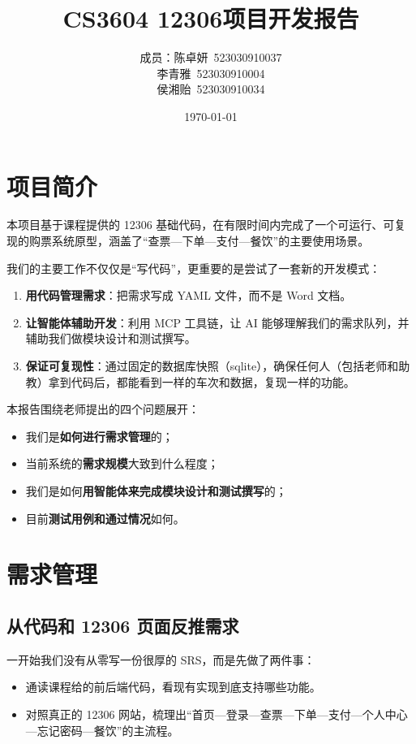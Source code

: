 \documentclass{article}
\title{CS3604 12306项目开发报告}
\author{
    成员：陈卓妍~523030910037 \\
         李青雅~523030910004 \\
         侯湘贻~523030910034 \\
}
\date{\today}
\begin{document}
\maketitle
\newpage
\tableofcontents
\newpage

\section{项目简介}

本项目基于课程提供的 12306 基础代码，在有限时间内完成了一个可运行、可复现的购票系统原型，涵盖了“查票—下单—支付—餐饮”的主要使用场景。

我们的主要工作不仅仅是“写代码”，更重要的是尝试了一套新的开发模式：
\begin{enumerate}
    \item \textbf{用代码管理需求}：把需求写成 YAML 文件，而不是 Word 文档。
    \item \textbf{让智能体辅助开发}：利用 MCP 工具链，让 AI 能够理解我们的需求队列，并辅助我们做模块设计和测试撰写。
    \item \textbf{保证可复现性}：通过固定的数据库快照（sqlite），确保任何人（包括老师和助教）拿到代码后，都能看到一样的车次和数据，复现一样的功能。
\end{enumerate}

本报告围绕老师提出的四个问题展开：
\begin{itemize}
    \item 我们是\textbf{如何进行需求管理}的；
    \item 当前系统的\textbf{需求规模}大致到什么程度；
    \item 我们是如何\textbf{用智能体来完成模块设计和测试撰写}的；
    \item 目前\textbf{测试用例和通过情况}如何。
\end{itemize}

\section{需求管理}

\subsection{从代码和 12306 页面反推需求}

一开始我们没有从零写一份很厚的 SRS，而是先做了两件事：
\begin{itemize}
    \item 通读课程给的前后端代码，看现有实现到底支持哪些功能。
    \item 对照真正的 12306 网站，梳理出“首页—登录—查票—下单—支付—个人中心—忘记密码—餐饮”的主流程。
\end{itemize}
\end{document}
